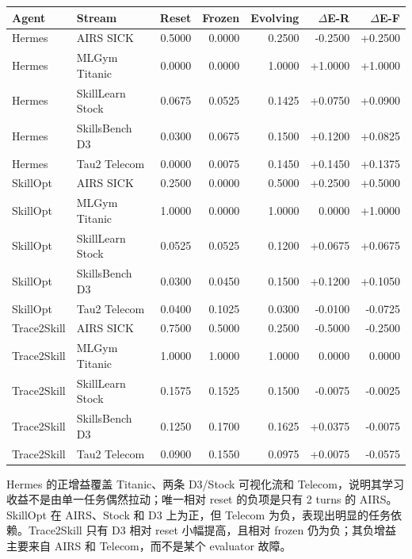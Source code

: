 \documentclass[11pt,a4paper]{article}
\begin{document}
\begin{center}
\scriptsize
\renewcommand{\arraystretch}{1.22}
\setlength{\tabcolsep}{4.6pt}
\begin{tabular}{llrrrrr}
\toprule
Agent & Stream & Reset & Frozen & Evolving & $\Delta$E-R & $\Delta$E-F \\
\midrule
Hermes & AIRS SICK & 0.5000 & 0.0000 & 0.2500 & -0.2500 & +0.2500 \\
Hermes & MLGym Titanic & 0.0000 & 0.0000 & 1.0000 & +1.0000 & +1.0000 \\
Hermes & SkillLearn Stock & 0.0675 & 0.0525 & 0.1425 & +0.0750 & +0.0900 \\
Hermes & SkillsBench D3 & 0.0300 & 0.0675 & 0.1500 & +0.1200 & +0.0825 \\
Hermes & Tau2 Telecom & 0.0000 & 0.0075 & 0.1450 & +0.1450 & +0.1375 \\
\midrule
SkillOpt & AIRS SICK & 0.2500 & 0.0000 & 0.5000 & +0.2500 & +0.5000 \\
SkillOpt & MLGym Titanic & 1.0000 & 0.0000 & 1.0000 & 0.0000 & +1.0000 \\
SkillOpt & SkillLearn Stock & 0.0525 & 0.0525 & 0.1200 & +0.0675 & +0.0675 \\
SkillOpt & SkillsBench D3 & 0.0300 & 0.0450 & 0.1500 & +0.1200 & +0.1050 \\
SkillOpt & Tau2 Telecom & 0.0400 & 0.1025 & 0.0300 & -0.0100 & -0.0725 \\
\midrule
Trace2Skill & AIRS SICK & 0.7500 & 0.5000 & 0.2500 & -0.5000 & -0.2500 \\
Trace2Skill & MLGym Titanic & 1.0000 & 1.0000 & 1.0000 & 0.0000 & 0.0000 \\
Trace2Skill & SkillLearn Stock & 0.1575 & 0.1525 & 0.1500 & -0.0075 & -0.0025 \\
Trace2Skill & SkillsBench D3 & 0.1250 & 0.1700 & 0.1625 & +0.0375 & -0.0075 \\
Trace2Skill & Tau2 Telecom & 0.0900 & 0.1550 & 0.0975 & +0.0075 & -0.0575 \\
\bottomrule
\end{tabular}
\end{center}

Hermes 的正增益覆盖 Titanic、两条 D3/Stock 可视化流和 Telecom，说明其学习收益不是由单一任务偶然拉动；唯一相对 reset 的负项是只有 2 turns 的 AIRS。SkillOpt 在 AIRS、Stock 和 D3 上为正，但 Telecom 为负，表现出明显的任务依赖。Trace2Skill 只有 D3 相对 reset 小幅提高，且相对 frozen 仍为负；其负增益主要来自 AIRS 和 Telecom，而不是某个 evaluator 故障。
\end{document}
